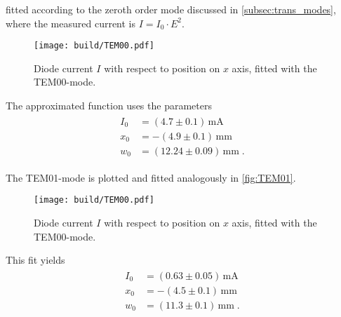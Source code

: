 fitted according to the zeroth order mode discussed in \autoref{subsec:trans_modes}, where the measured current is $I=I_0\cdot E^2$.  
\begin{figure}
   \centering
   \texttt{[image: build/TEM00.pdf]}
   \caption{Diode current $I$ with respect to position on $x$ axis, fitted with the TEM00-mode.}
   \label{fig:TEM00}
\end{figure}
The approximated function uses the parameters
\begin{align}
   \begin{split}
      I_0 &= (4.7 \pm 0.1)\,\unit{\milli\ampere}\\
      x_0 &= -(4.9 \pm 0.1)\,\unit{\mm}\\
      w_0 &= (12.24 \pm 0.09)\,\unit{\mm}\;.
      \label{eq:TEM00_fit}
   \end{split}
\end{align}

The TEM01-mode is plotted and fitted analogously in \autoref{fig:TEM01}.



\begin{figure}
   \centering
   \texttt{[image: build/TEM00.pdf]}
   \caption{Diode current $I$ with respect to position on $x$ axis, fitted with the TEM00-mode.}
   \label{fig:TEM01}
\end{figure}
This fit yields
\begin{align}
   \begin{split}
   I_0 &= (0.63 \pm 0.05)\,\unit{\milli\ampere}\\
   x_0 &= -(4.5 \pm 0.1)\,\unit{\mm}\\
   w_0 &= (11.3 \pm 0.1)\,\unit{\mm}\;.
   \label{eq:TEM01_fit}
   \end{split}
\end{align}

